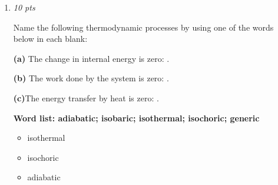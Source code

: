 \documentclass[11pt]{article}
\begin{document}
\begin{enumerate}[leftmargin=*,label=\textbf{Question \arabic*.}]
Choose the best answer at the end of each statement about ideal gas processes.

\textbf{(a)}In an isochoric process, the change in the internal energy equals the energy transfer.

    [ Select ]

  ["true", "false", "more information required"]

\textbf{(b)} In an isothermal process, the work done \textbf{by} the system equals the energy transfer by heat.

    [ Select ]

  ["False", "More information required", "True"]

\textbf{(c)} In an isobaric process, the change in the internal energy equals the energy transfer by heat minus the work done \textbf{on} the system.

    [ Select ]

  ["More information required", "true", "False"]

\textbf{(d)} In an adiabatic process, the work done \textbf{on} the system always equals the change in the internal energy.

    [ Select ]

  ["More information required", "False", "True"]

\begin{itemize}
  \item true
  \item false
  \item more information required
  \item False
  \item More information required
  \item True
  \item More information required
  \item true
  \item False
  \item More information required
  \item False
  \item True
\end{itemize}

\item \hfill \textit{10 pts}

Name the following thermodynamic processes by using one of the words below in each blank:

\textbf{(a)} The change in internal energy is zero:
.

\textbf{(b)} The work done by the system is zero:
.

\textbf{(c)}The energy transfer by heat is zero:
.

\textbf{Word list: adiabatic; isobaric; isothermal; isochoric; generic}

\begin{itemize}
  \item isothermal
  \item isochoric
  \item adiabatic
\end{itemize}

\end{enumerate}
\end{document}
